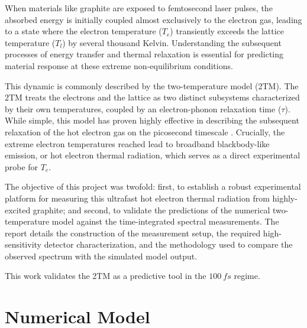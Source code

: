 \documentclass[
	a4paper,
]{scrarticle}
\begin{document}
When materials like graphite are exposed to femtosecond laser pulses, the absorbed energy is initially coupled almost exclusively to the electron gas, leading to a state where the electron temperature ($T_e$) transiently exceeds the lattice temperature ($T_l$) by several thousand Kelvin. Understanding the subsequent processes of energy transfer and thermal relaxation is essential for predicting material response at these extreme non-equilibrium conditions.

This dynamic is commonly described by the two-temperature model (2TM). The 2TM treats the electrons and the lattice as two distinct subsystems characterized by their own temperatures, coupled by an electron-phonon relaxation time ($\tau$). While simple, this model has proven highly effective in describing the subsequent relaxation of the hot electron gas on the picosecond timescale \cite{stangeHotElectronCooling2015}. Crucially, the extreme electron temperatures reached lead to broadband blackbody-like emission, or hot electron thermal radiation, which serves as a direct experimental probe for $T_e$.

The objective of this project was twofold: first, to establish a robust experimental platform for measuring this ultrafast hot electron thermal radiation from highly-excited graphite; and second, to validate the predictions of the numerical two-temperature model against the time-integrated spectral measurements. The report details the construction of the measurement setup, the required high-sensitivity detector characterization, and the methodology used to compare the observed spectrum with the simulated model output.

This work validates the 2TM as a predictive tool in the $\SI{100}{fs}$ regime.


\section{Numerical Model}
\end{document}
